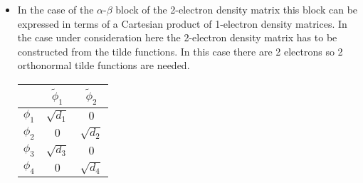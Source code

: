\documentclass{amsart}
\begin{document}
\begin{itemize}
\begin{eqnarray}
\begin{matrix}
         d_{1} & 0 & 0 & 0 \\
         0 & d_{2} & 0 & 0 \\
         0 & 0 & d_{3} & 0 \\
         0 & 0 & 0 & d_{4} 
         \end{matrix}\right)
         \end{eqnarray}
         where also $d_1 = d_2$ and $d_3 = d_4$.
\item In the case of the $\alpha$-$\beta$ block of the 2-electron density matrix this block can be
         expressed in terms of a Cartesian product of 1-electron density matrices. In the case under
         consideration here the 2-electron density matrix has to be constructed from the tilde 
         functions. In this case there are 2 electrons so 2 orthonormal tilde functions are needed.
        
         \begin{tabular}{c|cc}
               & $\tilde{\phi}_1$ & $\tilde{\phi}_2$ \\
         \hline
         $\phi_1$ & $\sqrt{d_1}$ & $0$ \\
         $\phi_2$ & $0$               & $\sqrt{d_2}$ \\
         $\phi_3$ & $\sqrt{d_3}$ & $0$ \\
         $\phi_4$ & $0$               & $\sqrt{d_4}$
         \end{tabular}
         

\end{itemize}
\end{document}
